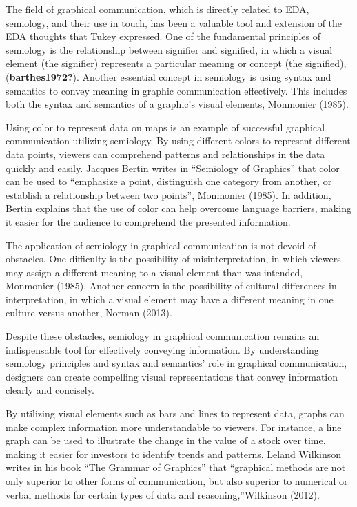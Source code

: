\documentclass[print]{nuthesis}
\begin{document}
The field of graphical communication, which is directly related to EDA, semiology, and their use in touch, has been a valuable tool and extension of the EDA thoughts that Tukey expressed.
One of the fundamental principles of semiology is the relationship between signifier and signified, in which a visual element (the signifier) represents a particular meaning or concept (the signified), (\textbf{barthes1972?}).
Another essential concept in semiology is using syntax and semantics to convey meaning in graphic communication effectively.
This includes both the syntax and semantics of a graphic's visual elements, Monmonier (1985).

Using color to represent data on maps is an example of successful graphical communication utilizing semiology.
By using different colors to represent different data points, viewers can comprehend patterns and relationships in the data quickly and easily.
Jacques Bertin writes in ``Semiology of Graphics'' that color can be used to ``emphasize a point, distinguish one category from another, or establish a relationship between two points'', Monmonier (1985).
In addition, Bertin explains that the use of color can help overcome language barriers, making it easier for the audience to comprehend the presented information.

The application of semiology in graphical communication is not devoid of obstacles.
One difficulty is the possibility of misinterpretation, in which viewers may assign a different meaning to a visual element than was intended, Monmonier (1985).
Another concern is the possibility of cultural differences in interpretation, in which a visual element may have a different meaning in one culture versus another, Norman (2013).

Despite these obstacles, semiology in graphical communication remains an indispensable tool for effectively conveying information.
By understanding semiology principles and syntax and semantics' role in graphical communication, designers can create compelling visual representations that convey information clearly and concisely.

By utilizing visual elements such as bars and lines to represent data, graphs can make complex information more understandable to viewers.
For instance, a line graph can be used to illustrate the change in the value of a stock over time, making it easier for investors to identify trends and patterns. Leland Wilkinson writes in his book ``The Grammar of Graphics'' that ``graphical methods are not only superior to other forms of communication, but also superior to numerical or verbal methods for certain types of data and reasoning,''Wilkinson (2012).
\end{document}
